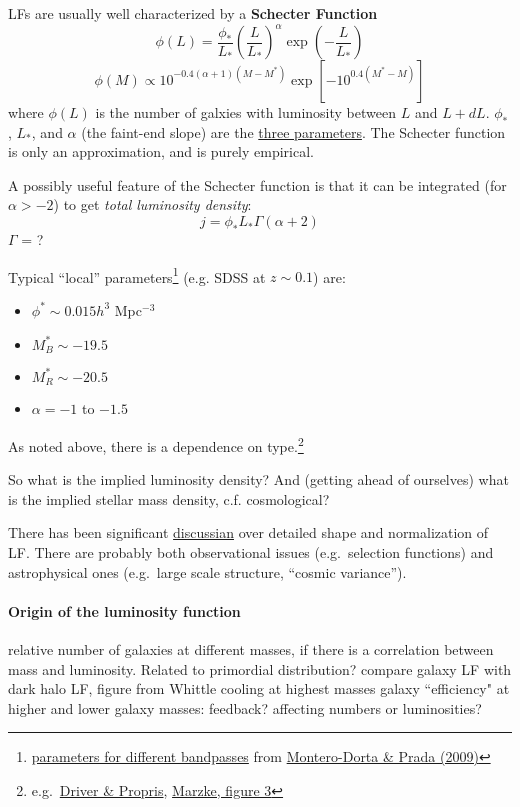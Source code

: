 \documentclass{article}
\newcommand{\mynotes}[1]{\textcolor{cadmiumgreen}{#1}}
\begin{document}
LFs are usually well characterized by a \textbf{Schecter Function}
\[
    \phi(L) = \frac{\phi_{*}}{L_{*}} \left( \frac{L}{L_{*}} \right) ^{\alpha}
    \exp\left( -\frac{L}{L_{*}} \right)
    \]
\[
    \phi(M) \propto 10^{ -0.4 \left( \alpha + 1 \right)
    \left( M - M^{*} \right) }
    \exp \left[ -10^{ 0.4(M^{*} - M) } \right]
    \]
where $\phi(L)$ is the number of galxies with luminosity between
$L$ and $L + dL$.  $\phi_{*}$, $L_{*}$, and $\alpha$ (the faint-end slope)
are the
\href{http://astronomy.nmsu.edu/holtz/a555/resources/schechter.gif}
{three parameters}. The Schecter function is only an approximation, and
is purely empirical.

A possibly useful feature of the Schecter function is that it can be
integrated (for $\alpha > -2$) to get \textit{total luminosity density}:
\[
    j = \phi_{*}L_{*}\Gamma\left(\alpha + 2\right)
    \]
\mynotes{$\Gamma$ = ?}

Typical ``local'' parameters\footnote{
    \href{http://astronomy.nmsu.edu/holtz/a555/resources/monterotab2.gif}
    {parameters for different bandpasses} from
    \href{http://adsabs.harvard.edu/abs/2009MNRAS.399.1106M}
    {Montero-Dorta \& Prada (2009)}
}
(e.g. SDSS at $z\sim0.1$) are:
\begin{itemize}
    \item $\phi^{*}\sim0.015h^{3}$ Mpc$^{-3}$
    \item $M_{B}^{*}\sim-19.5$
    \item $M_{R}^{*}\sim-20.5$
    \item $\alpha=-1$ to $-1.5$
\end{itemize}
As noted above, there is a dependence on type.\footnote{
    e.g.\ \href{http://astronomy.nmsu.edu/holtz/a555/resources/lf_environment.gif}
    {Driver \& Propris},
    \href{http://astronomy.nmsu.edu/holtz/a555/html/diagrams/a616/marzke3.htm}
    {Marzke, figure 3}
}

So what is the implied luminosity density? And (getting ahead of ourselves)
what is the implied stellar mass density, c.f. cosmological?

There has been significant \href{http://astronomy.nmsu.edu/holtz/a555/images/blantontab3.htm}
{discussian} over detailed shape and normalization of
LF\@. There are probably both observational issues (e.g.\ selection functions)
and astrophysical ones (e.g.\ large scale structure, ``cosmic variance'').

\paragraph{Origin of the luminosity function}
relative number of galaxies at different masses, if there is a correlation
between mass and luminosity. Related to primordial distribution? compare galaxy
LF with dark halo LF, figure from Whittle cooling at highest masses galaxy
``efficiency" at higher and lower galaxy masses: feedback? affecting numbers or
luminosities?
\end{document}
